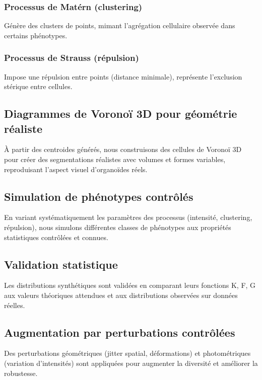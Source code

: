 \subsubsection{Processus de Matérn (clustering)}
Génère des clusters de points, mimant l'agrégation cellulaire observée dans certains phénotypes.

\subsubsection{Processus de Strauss (répulsion)}
Impose une répulsion entre points (distance minimale), représente l'exclusion stérique entre cellules.

\subsection{Diagrammes de Voronoï 3D pour géométrie réaliste}

À partir des centroides générés, nous construisons des cellules de Voronoï 3D pour créer des segmentations réalistes avec volumes et formes variables, reproduisant l'aspect visuel d'organoïdes réels.

\subsection{Simulation de phénotypes contrôlés}

En variant systématiquement les paramètres des processus (intensité, clustering, répulsion), nous simulons différentes classes de phénotypes aux propriétés statistiques contrôlées et connues.

\subsection{Validation statistique}

Les distributions synthétiques sont validées en comparant leurs fonctions K, F, G aux valeurs théoriques attendues et aux distributions observées sur données réelles.

\subsection{Augmentation par perturbations contrôlées}

Des perturbations géométriques (jitter spatial, déformations) et photométriques (variation d'intensités) sont appliquées pour augmenter la diversité et améliorer la robustesse.

